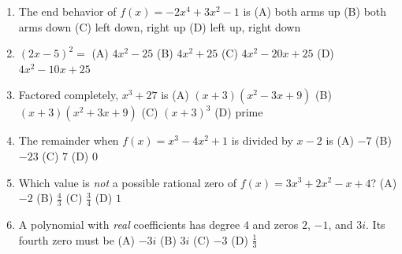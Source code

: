 \documentclass[10pt]{article}
\begin{document}
\begin{enumerate}[leftmargin=\dimexpr1.9em+0.4in+6pt\relax, itemsep=9pt]
  \item \leavevmode\llap{\choicebox{\gradedblank[id=qb1, type=choice, points=2, answer={B}]{0.4in}{10pt}}\hspace{\dimexpr\leftmargin-0.4in-2pt\relax}}The end behavior of $f(x)=-2x^4+3x^2-1$ is
    \hfill (A) both arms up \quad (B) both arms down \quad (C) left down, right up \quad (D) left up, right down
  \item \leavevmode\llap{\choicebox{\gradedblank[id=qb2, type=choice, points=2, answer={C}]{0.4in}{10pt}}\hspace{\dimexpr\leftmargin-0.4in-2pt\relax}}$(2x-5)^2=$
    \hfill (A) $4x^2-25$ \quad (B) $4x^2+25$ \quad (C) $4x^2-20x+25$ \quad (D) $4x^2-10x+25$
  \item \leavevmode\llap{\choicebox{\gradedblank[id=qb3, type=choice, points=2, answer={A}]{0.4in}{10pt}}\hspace{\dimexpr\leftmargin-0.4in-2pt\relax}}Factored completely, $x^3+27$ is
    \hfill (A) $(x+3)(x^2-3x+9)$ \quad (B) $(x+3)(x^2+3x+9)$ \quad (C) $(x+3)^3$ \quad (D) prime
  \item \leavevmode\llap{\choicebox{\gradedblank[id=qb4, type=choice, points=2, answer={A}]{0.4in}{10pt}}\hspace{\dimexpr\leftmargin-0.4in-2pt\relax}}The remainder when $f(x)=x^3-4x^2+1$ is divided by $x-2$ is
    \hfill (A) $-7$ \quad (B) $-23$ \quad (C) $7$ \quad (D) $0$
  \item \leavevmode\llap{\choicebox{\gradedblank[id=qb5, type=choice, points=2, answer={C}]{0.4in}{10pt}}\hspace{\dimexpr\leftmargin-0.4in-2pt\relax}}Which value is \emph{not} a possible rational zero of $f(x)=3x^3+2x^2-x+4$?
    \hfill (A) $-2$ \quad (B) $\frac{4}{3}$ \quad (C) $\frac{3}{4}$ \quad (D) $1$
  \item \leavevmode\llap{\choicebox{\gradedblank[id=qb6, type=choice, points=2, answer={A}]{0.4in}{10pt}}\hspace{\dimexpr\leftmargin-0.4in-2pt\relax}}A polynomial with \emph{real} coefficients has degree $4$ and zeros $2$, $-1$, and $3i$. Its fourth zero must be
    \hfill (A) $-3i$ \quad (B) $3i$ \quad (C) $-3$ \quad (D) $\frac13$
\end{enumerate}
\end{document}
